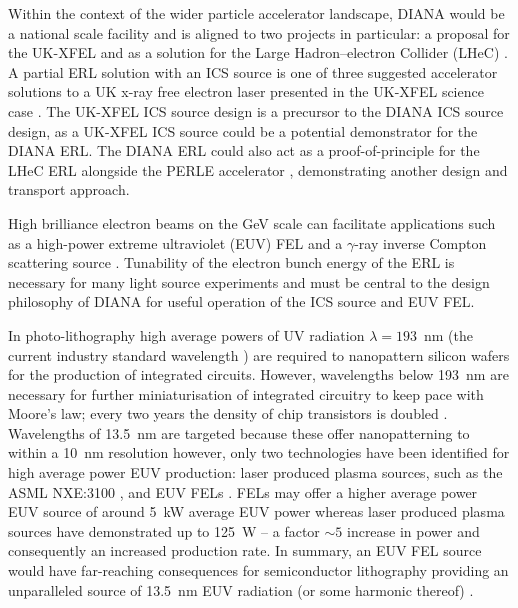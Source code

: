 \documentclass[../main.tex]{subfiles}
\begin{document}
Within the context of the wider particle accelerator landscape, DIANA would be a national scale facility and is aligned to two projects in particular: a proposal for the UK-XFEL \cite{burnett2020uk} and as a solution for the Large Hadron--electron Collider (LHeC) \cite{valloni2013strawman,bruning2019exploring,holzer2021accelerator,agostini2021large}. A partial ERL solution with an ICS source is one of three suggested accelerator solutions to a UK x-ray free electron laser presented in the UK-XFEL science case \cite{burnett2020uk}. The UK-XFEL ICS source design is a precursor to the DIANA ICS source design, as a UK-XFEL ICS source could be a potential demonstrator for the DIANA ERL. The DIANA ERL could also act as a proof-of-principle for the LHeC ERL alongside the PERLE accelerator \cite{angal2018perle}, demonstrating another design and transport approach.

High brilliance electron beams on the \si{\giga\electronvolt} scale can facilitate applications such as a high-power extreme ultraviolet (EUV) FEL \cite{akkermans2017compact} and a $\gamma$-ray inverse Compton scattering source \cite{hajima2008proposal,hajima2014application}. Tunability of the electron bunch energy of the ERL is necessary for many light source experiments and must be central to the design philosophy of DIANA for useful operation of the ICS source and EUV FEL. 

In photo-lithography high average powers of UV radiation $\lambda=193$~\si{\nano\meter} (the current industry standard wavelength \cite{socol2011compact}) are required to nanopattern silicon wafers for the production of integrated circuits. However, wavelengths below 193~\si{\nano\meter} are necessary for further miniaturisation of integrated circuitry to keep pace with Moore's law; every two
years the density of chip transistors is doubled \cite{moore1975international}. Wavelengths of 13.5~\si{\nano\meter} are targeted because these offer nanopatterning to within a 10~\si{\nano\meter} resolution \cite{wagner2010lithography} however, only two technologies have been identified for high average power EUV production: laser produced plasma sources, such as the ASML NXE:3100 \cite{wagner2011euv,socol2011compact}, and EUV FELs \cite{socol2011compact,akkermans2017compact}. FELs may offer a higher average power EUV source of around 5~\si{\kilo\watt} average EUV power \cite{akkermans2017compact} whereas laser produced plasma sources have demonstrated up to 125~\si{\watt} \cite{} -- a factor $\sim5$ increase in power and consequently an increased production rate. In summary, an EUV FEL source would have far-reaching consequences for semiconductor lithography providing an unparalleled source of 13.5~\si{\nano\meter} EUV radiation (or some harmonic thereof) \cite{socol2011compact}.  
\end{document}
